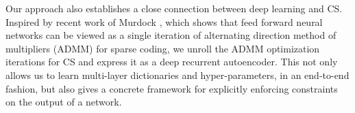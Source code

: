 
Our approach also establishes a close connection between deep learning and CS. Inspired by recent work of Murdock \etal, which shows that feed forward neural networks can be viewed as a single iteration of alternating direction method of multipliers (ADMM) for sparse coding, we unroll the ADMM optimization iterations for CS and express it as a deep recurrent autoencoder. This not only allows us to learn multi-layer dictionaries and hyper-parameters, in an end-to-end fashion, but also gives a concrete framework for explicitly enforcing constraints on the output of a network.






